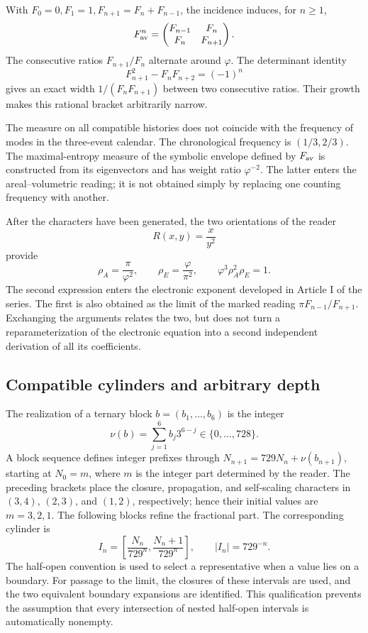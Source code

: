 With \(F_0=0,F_1=1,F_{n+1}=F_n+F_{n-1}\), the incidence induces, for \(n\geq1\),
\[
 F_{\rm av}^n=\begin{pmatrix}F_{n-1}&F_n\\F_n&F_{n+1}\end{pmatrix}.
\]
The consecutive ratios \(F_{n+1}/F_n\) alternate around \(\varphi\). The determinant identity
\[
 F_{n+1}^2-F_nF_{n+2}=(-1)^n
\]
gives an exact width \(1/(F_nF_{n+1})\) between two consecutive ratios. Their growth makes this rational bracket arbitrarily narrow.

The measure on all compatible histories does not coincide with the frequency of modes in the three-event calendar. The chronological frequency is \((1/3,2/3)\). The maximal-entropy measure of the symbolic envelope defined by \(F_{\rm av}\) is constructed from its eigenvectors and has weight ratio \(\varphi^{-2}\). The latter enters the areal--volumetric reading; it is not obtained simply by replacing one counting frequency with another.

After the characters have been generated, the two orientations of the reader
\[
 R(x,y)=\frac{x}{y^2}
\]
provide
\begin{equation}
 \rho_A=\frac\pi{\varphi^2},\qquad
 \rho_E=\frac\varphi{\pi^2},\qquad
 \varphi^3\rho_A^2\rho_E=1.
 \label{eq:areal-electron}
\end{equation}
The second expression enters the electronic exponent developed in Article I of the series. The first is also obtained as the limit of the marked reading \(\pi F_{n-1}/F_{n+1}\). Exchanging the arguments relates the two, but does not turn a reparameterization of the electronic equation into a second independent derivation of all its coefficients.



\subsection{Compatible cylinders and arbitrary depth}

The realization of a ternary block \(b=(b_1,\ldots,b_6)\) is the integer
\[
 \nu(b)=\sum_{j=1}^6b_j3^{6-j}\in\{0,\ldots,728\}.
\]
A block sequence defines integer prefixes through \(N_{n+1}=729N_n+\nu(b_{n+1})\), starting at \(N_0=m\), where \(m\) is the integer part determined by the reader. The preceding brackets place the closure, propagation, and self-scaling characters in \((3,4)\), \((2,3)\), and \((1,2)\), respectively; hence their initial values are \(m=3,2,1\). The following blocks refine the fractional part. The corresponding cylinder is
\begin{equation}
 I_n=\left[\frac{N_n}{729^n},\frac{N_n+1}{729^n}\right],
 \qquad |I_n|=729^{-n}.
 \label{eq:cilindro}
\end{equation}
The half-open convention is used to select a representative when a value lies on a boundary. For passage to the limit, the closures of these intervals are used, and the two equivalent boundary expansions are identified. This qualification prevents the assumption that every intersection of nested half-open intervals is automatically nonempty.

